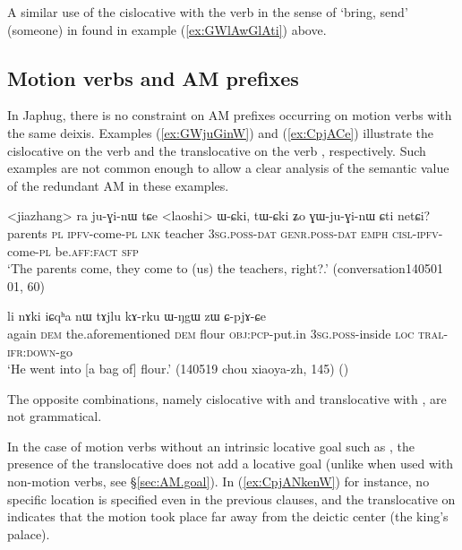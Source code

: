 A similar use of the cislocative with the verb  in the sense of `bring, send' (someone) in found in example (\ref{ex:GWlAwGlAti}) above.

\subsection{Motion verbs and AM prefixes} \label{sec:motion.verbs.AM}
In Japhug, there is no constraint on AM prefixes occurring on motion verbs with the same deixis. Examples (\ref{ex:GWjuGinW}) and (\ref{ex:CpjACe}) illustrate the cislocative on the verb  and the translocative on the verb , respectively. Such examples are not common enough to allow a clear analysis of the semantic value of the redundant AM in these examples.

\begin{exe}
\ex \label{ex:GWjuGinW}
 \gll <jiazhang> ra ju-ɣi-nɯ tɕe <laoshi> ɯ-ɕki, tɯ-ɕki ʑo ɣɯ-ju-ɣi-nɯ ɕti netɕi? \\
 parents \textsc{pl} \textsc{ipfv}-come-\textsc{pl} \textsc{lnk} teacher \textsc{3sg}.\textsc{poss}-\textsc{dat} \textsc{genr}.\textsc{poss}-\textsc{dat} \textsc{emph} \textsc{cisl}-\textsc{ipfv}-come-\textsc{pl} be.\textsc{aff}:\textsc{fact} \textsc{sfp} \\
 \glt `The parents come, they come to (us) the teachers, right?.' (conversation140501 01, 60)
\end{exe}

\begin{exe}
\ex \label{ex:CpjACe}
 \gll li nɤki iɕqʰa nɯ tɤjlu kɤ-rku ɯ-ŋgɯ zɯ ɕ-pjɤ-ɕe \\
 again \textsc{dem} the.aforementioned \textsc{dem} flour \textsc{obj}:\textsc{pcp}-put.in \textsc{3sg}.\textsc{poss}-inside \textsc{loc} \textsc{tral}-\textsc{ifr}:\textsc{down}-go \\
 \glt `He went into [a bag of] flour.' (140519 chou xiaoya-zh, 145) 
()
\end{exe}

The opposite combinations, namely cislocative with  and translocative with , are not grammatical. 

In the case of motion verbs without an intrinsic locative goal such as , the presence of the translocative does not add a locative goal (unlike when used with non-motion verbs, see §\ref{sec:AM.goal}). In (\ref{ex:CpjANkenW}) for instance, no specific location is specified even in the previous clauses, and the translocative on   indicates that the motion took place far away from the deictic center (the king's palace).

